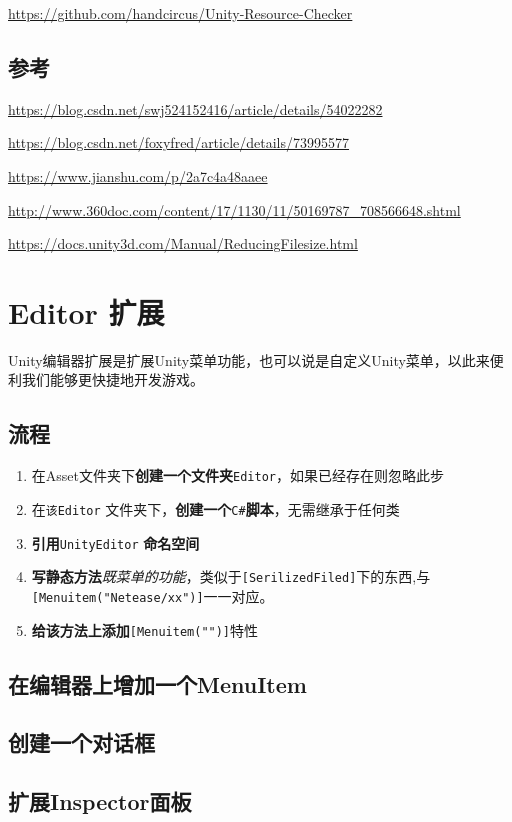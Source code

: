 \documentclass[UTF8,a4paper,12pt]{ctexbook}
\begin{document}
			\url{https://github.com/handcircus/Unity-Resource-Checker}
			
			
			
			
			
	\section{参考}
		\url{https://blog.csdn.net/swj524152416/article/details/54022282}
		
		\url{https://blog.csdn.net/foxyfred/article/details/73995577}
		
		\url{https://www.jianshu.com/p/2a7c4a48aaee}
		
		\url{http://www.360doc.com/content/17/1130/11/50169787_708566648.shtml}
		
		\url{https://docs.unity3d.com/Manual/ReducingFilesize.html}
\chapter{Editor 扩展}
	Unity编辑器扩展是扩展Unity菜单功能，也可以说是自定义Unity菜单，以此来便利我们能够更快捷地开发游戏。
	\section{流程}
		\begin{enumerate}
			\item 在Asset文件夹下\textbf{创建一个文件夹}\verb|Editor|，如果已经存在则忽略此步
			\item 在\verb|该Editor| 文件夹下，\textbf{创建一个}\verb|C#|\textbf{脚本}，无需继承于任何类
			\item \textbf{引用}\verb|UnityEditor| \textbf{命名空间}
			\item \textbf{写静态方法}\textit{既菜单的功能}，类似于\verb|[SerilizedFiled]|下的东西,与\verb|[Menuitem("Netease/xx")]|一一对应。
			\item \textbf{给该方法上添加}\verb|[Menuitem("")]|特性
		\end{enumerate}	
	
	\section{在编辑器上增加一个MenuItem}
	
	
	\section{创建一个对话框}
	
	
	\section{扩展Inspector面板}
	
\end{document}
